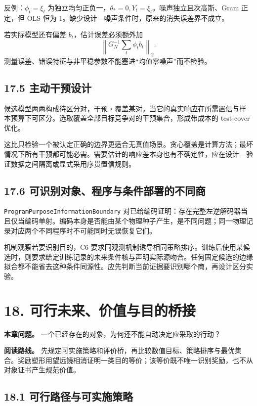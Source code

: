 \documentclass[
  11pt,
  oneside]{book}
\begin{document}
反例：\(\phi_t=\xi_t\) 为独立均匀正负一，\(\theta_*=0,Y_t=\xi_t\)。噪声独立且次高斯、Gram 正定，但 OLS 恒为 1。缺少设计---噪声条件时，原来的消失误差界不成立。

若实际模型还有偏差 \(b_t\)，估计误差必须额外加 \[\left\|G_N^{-1}\sum_t\phi_tb_t\right\|_2.\] 测量误差、错误特征与非平稳参数不能塞进``均值零噪声''而不检验。

\section{17.5 主动干预设计}\label{ux4e3bux52a8ux5e72ux9884ux8bbeux8ba1}

候选模型两两构成待区分对，干预 \(i\) 覆盖某对，当它的真实响应在所需置信与样本预算下可区分。选取覆盖全部目标竞争对的干预集合，形成带成本的 test-cover 优化。

这比只检验一个被认定正确的边界更适合无真值场景。贪心覆盖是计算方法；最坏情况下所有干预都可能必需。需要估计的响应差本身也有不确定性，应在设计---验证数据之间隔离或显式采用序贯置信规则。

\section{17.6 可识别对象、程序与条件部署的不同商}\label{ux53efux8bc6ux522bux5bf9ux8c61ux7a0bux5e8fux4e0eux6761ux4ef6ux90e8ux7f72ux7684ux4e0dux540cux5546}

\nolinkurl{ProgramPurposeInformationBoundary} 对已给编码证明：存在完整左逆解码器当且仅当编码单射。编码本身是否能由某个物理种子产生，是不同问题；同一物理记录对应两个不同程序时不可能同时无误恢复它们。

机制观察若要识别目的，C6 要求同观测机制诱导相同策略排序。训练后使用某候选时，则要求给定训练记录的未来条件核与声明实际源吻合。任何固定候选的边缘拟合都不能省去这种条件同源性。应先判断当前证据要识别哪个商，再设计区分实验。

\chapter{18. 可行未来、价值与目的桥接}\label{ch-18}

\textbf{本章问题。} 一个已经存在的对象，为何还不能自动决定应采取的行动？

\textbf{阅读路线。} 先规定可实施策略和评价桥，再比较数值目标、策略排序与最优集合。奖励塑形用望远镜相消证明一类目的等价；该等价既不唯一识别奖励，也不从对象证书产生规范价值。

\section{18.1 可行路径与可实施策略}\label{ux53efux884cux8defux5f84ux4e0eux53efux5b9eux65bdux7b56ux7565}
\end{document}
